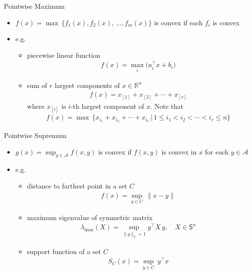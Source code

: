 \documentclass[10pt,handout]{beamer}
\newcommand{\ds}{\displaystyle}
\theoremstyle{definition}
\begin{document}
\begin{frame}{Pointwise Maximum}
  \begin{itemize}
    \item $\ds f(x) = \max\,\{f_1(x),f_2(x),\,\ldots,f_m(x)\}$ is convex if each $f_i$ is convex
    \item e.g.
      \begin{itemize}
        \item piecewise linear function
          \begin{align*}
            f(x) = \max_i\big(a_i^\top x + b_i\big)
          \end{align*}
        \item sum of $r$ largest components of $x\in\mathbb{R}^n$  
          \begin{align*}
            f(x) = x_{[1]} + x_{[2]} + \cdots + x_{[r]}
          \end{align*}
          where $x_{[i]}$ is $i$-th largest component of $x$. Note that
          \begin{align*}
            f(x) = \max\,\{x_{i_1} + x_{i_2} + \cdots + x_{i_r}\,|\,1\leqslant i_1 < i_2 < \cdots < i_r\leqslant n\}
          \end{align*}
      \end{itemize}
  \end{itemize}
\end{frame}

\begin{frame}{Pointwise Supremum}
  \begin{itemize}
    \item $\ds g(x) = \sup_{y\in\mathcal{A}}f(x, y)$ is convex if $f(x, y)$ is convex in $x$ for each $y\in\mathcal{A}$
    \item e.g.
      \begin{itemize}
        \item distance to farthest point in a set $C$
          \begin{align*}
            f(x) = \sup_{y\in C}\,\|x - y\|
          \end{align*}
        \item maximum eigenvalue of symmetric matrix 
          \begin{align*}
            \lambda_{\text{max}}(X) = \sup_{\|y\|_2 = 1} y^\top X\,y, \quad X\in\mathsf{S}^n 
          \end{align*}
        \item support function of a set $C$
          \begin{align*}
            S_C(x) = \sup_{y\in C}\,y^\top x
          \end{align*}
      \end{itemize}
  \end{itemize}
\end{frame}
\end{document}
